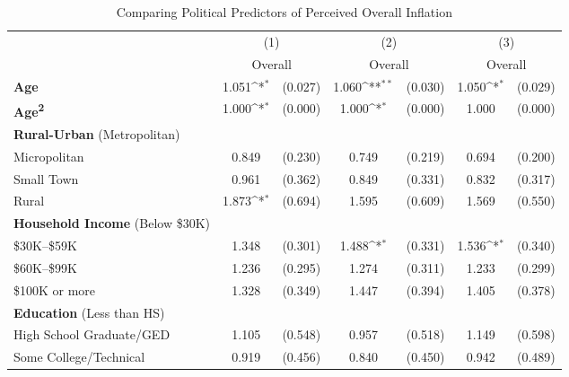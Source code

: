 \begin{table}[htbp]\centering \scriptsize

\def\sym#1{\ifmmode^{#1}\else\(^{#1}\)\fi}
\caption{Comparing Political Predictors of Perceived Overall Inflation}
\label{tab:main}
\begin{tabular}{l*{3}{cc}}
\hline\hline
                    &\multicolumn{2}{c}{(1)}           &\multicolumn{2}{c}{(2)}           &\multicolumn{2}{c}{(3)}           \\
                    &\multicolumn{2}{c}{Overall}       &\multicolumn{2}{c}{Overall}       &\multicolumn{2}{c}{Overall}       \\
\hline
\textbf{Age}        &       1.051\sym{*}  &     (0.027)&       1.060\sym{**} &     (0.030)&       1.050\sym{*}  &     (0.029)\\
\textbf{Age\textsuperscript{2}}&       1.000\sym{*}  &     (0.000)&       1.000\sym{*}  &     (0.000)&       1.000         &     (0.000)\\
\textbf{Rural-Urban} (Metropolitan) & & &  &  &     &  \\
Micropolitan        &       0.849         &     (0.230)&       0.749         &     (0.219)&       0.694         &     (0.200)\\
Small Town          &       0.961         &     (0.362)&       0.849         &     (0.331)&       0.832         &     (0.317)\\
Rural               &       1.873\sym{*}  &     (0.694)&       1.595         &     (0.609)&       1.569         &     (0.550)\\
\textbf{Household Income} (Below \$30K) & & &  &  &     &  \\
\$30K--\$59K        &       1.348         &     (0.301)&       1.488\sym{*}  &     (0.331)&       1.536\sym{*}  &     (0.340)\\
\$60K--\$99K        &       1.236         &     (0.295)&       1.274         &     (0.311)&       1.233         &     (0.299)\\
\$100K or more      &       1.328         &     (0.349)&       1.447         &     (0.394)&       1.405         &     (0.378)\\
\textbf{Education} (Less than HS) & & &  &  &     &  \\
High School Graduate/GED&       1.105         &     (0.548)&       0.957         &     (0.518)&       1.149         &     (0.598)\\
Some College/Technical&       0.919         &     (0.456)&       0.840         &     (0.450)&       0.942         &     (0.489)\\

\end{tabular}
\end{table}
